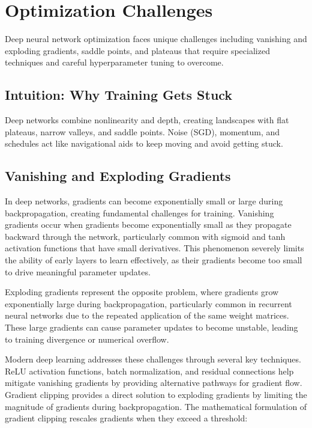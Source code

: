 
\section{Optimization Challenges }
\label{sec:challenges}

Deep neural network optimization faces unique challenges including vanishing and exploding gradients, saddle points, and plateaus that require specialized techniques and careful hyperparameter tuning to overcome.

\subsection{Intuition: Why Training Gets Stuck}

Deep networks combine nonlinearity and depth, creating landscapes with flat plateaus, narrow valleys, and saddle points. Noise (SGD), momentum, and schedules act like navigational aids to keep moving and avoid getting stuck.

\subsection{Vanishing and Exploding Gradients}

In deep networks, gradients can become exponentially small or large during backpropagation, creating fundamental challenges for training. Vanishing gradients occur when gradients become exponentially small as they propagate backward through the network, particularly common with sigmoid and tanh activation functions that have small derivatives. This phenomenon severely limits the ability of early layers to learn effectively, as their gradients become too small to drive meaningful parameter updates.

Exploding gradients represent the opposite problem, where gradients grow exponentially large during backpropagation, particularly common in recurrent neural networks due to the repeated application of the same weight matrices. These large gradients can cause parameter updates to become unstable, leading to training divergence or numerical overflow.

Modern deep learning addresses these challenges through several key techniques. ReLU activation functions, batch normalization, and residual connections help mitigate vanishing gradients by providing alternative pathways for gradient flow. Gradient clipping provides a direct solution to exploding gradients by limiting the magnitude of gradients during backpropagation. The mathematical formulation of gradient clipping rescales gradients when they exceed a threshold:

